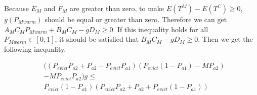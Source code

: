 Because $E_{M}$ and $F_{M}$ are greater than zero, to make $E(T^{M}) - E(T^{C}) \geq 0$, $y(P_{Mwarm})$ should be equal or greater than zero.
Therefore we can get $ A_{M}C_{M}P_{Mwarm}+B_{M}C_{M}-gD_{M} \geq 0$.
If this inequality holds for all $P_{Mwarm} \in [0,1]$, it should be satisfied that $B_{M}C_{M}-gD_{M} \geq 0$.
Then we get the following inequality.

\begin{equation}
\begin{split}
&((P_{evict}P_{a2}+P_{a2}-P_{evict}P_{a1})(P_{evict}(1-P_{a1})-MP_{a2}) \\
&-MP_{evict}P_{a2})g \leq \\
&P_{evict}(1-P_{a1})(P_{evict}P_{a2}+P_{a2}+P_{evict}(1-P_{a1}))
\end{split}\end{equation}

